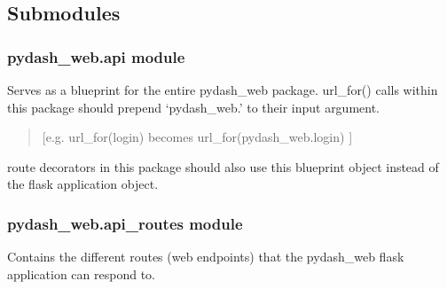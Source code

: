 \documentclass[letterpaper,10pt,english]{sphinxmanual}
\begin{document}

\begin{fulllineitems}
\label{\detokenize{pydash_web.controller.visitor_heatmap:pydash_web.controller.visitor_heatmap.get_hourly_data}}
\end{fulllineitems}


\begin{fulllineitems}
\label{\detokenize{pydash_web.controller.visitor_heatmap:pydash_web.controller.visitor_heatmap.visitor_heatmap}}
\end{fulllineitems}



\subsection{Submodules}
\label{\detokenize{pydash_web:submodules}}

\subsubsection{pydash\_web.api module}
\label{\detokenize{pydash_web.api:module-pydash_web.api}}\label{\detokenize{pydash_web.api:pydash-web-api-module}}\label{\detokenize{pydash_web.api::doc}}
Serves as a blueprint for the entire pydash\_web package.
url\_for() calls within this package should prepend ‘pydash\_web.’ to their input argument.
\begin{quote}

{[}e.g. url\_for(login) becomes url\_for(pydash\_web.login) {]}
\end{quote}

route decorators in this package should also use this blueprint object instead of the flask application object.


\subsubsection{pydash\_web.api\_routes module}
\label{\detokenize{pydash_web.api_routes:module-pydash_web.api_routes}}\label{\detokenize{pydash_web.api_routes:pydash-web-api-routes-module}}\label{\detokenize{pydash_web.api_routes::doc}}
Contains the different routes (web endpoints) that the pydash\_web flask application can respond to.
\end{document}
